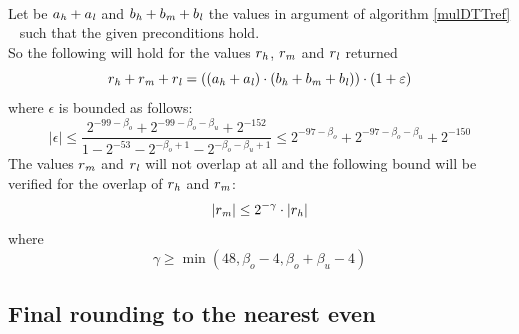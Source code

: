 \begin{theorem} ~ \\
Let be $a_{\mathit{h}} + a_{\mathit{l}}$ and $b_{\mathit{h}} + b_{\mathit{m}} + b_{\mathit{l}}$ the values in argument of algorithm \ref{mulDTTref} \MulDTT~ such that 
the given preconditions hold.\\
So the following will hold for the values $r_{\mathit{h}}$, $r_{\mathit{m}}$ and $r_{\mathit{l}}$ returned
$$r_{\mathit{h}} + r_{\mathit{m}} + r_{\mathit{l}} = \left(\left(a_{\mathit{h}} + a_{\mathit{l}} \right) \cdot \left( b_{\mathit{h}} + b_{\mathit{m}} + b_{\mathit{l}} \right)\right) \cdot \left(1 + \varepsilon\right)$$
where $\epsilon$ is bounded as follows:
$$\left \vert \epsilon \right \vert \leq \frac{2^{-99 - \beta_o} + 2^{-99 - \beta_o - \beta_u} + 2^{-152}}
                                              {1 - 2^{-53} - 2^{-\beta_o + 1} - 2^{-\beta_o - \beta_u + 1}}
                                    \leq 2^{-97 - \beta_o} + 2^{-97 - \beta_o - \beta_u} + 2^{-150}$$
The values $r_{\mathit{m}}$ and  $r_{\mathit{l}}$ will not overlap at all and the following bound will be verified for the overlap of 
$r_{\mathit{h}}$ and $r_{\mathit{m}}$:
$$\left \vert r_{\mathit{m}} \right \vert \leq 2^{-\gamma} \cdot \left \vert r_{\mathit{h}} \right \vert$$
where
$$\gamma \geq \min\left( 48, \beta_o - 4, \beta_o + \beta_u - 4 \right)$$
\end{theorem}


\subsection{Final rounding to the nearest even}

